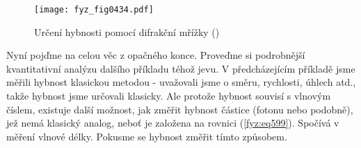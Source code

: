     \begin{figure}[ht!] %
      \centering
      \texttt{[image: fyz\_fig0434.pdf]}
      \caption{Určení hybnosti pomocí difrakční mřížky (\cite[s.~513]{Feynman01})}
      \label{fyz:fig0434}
    \end{figure}

    Nyní pojďme na celou věc z opačného konce. Proveďme si podrobnější kvantitativní analýzu dalšího
    příkladu téhož jevu. V předcházejícím příkladě jsme měřili hybnost klasickou metodou - uvažovali
    jsme o směru, rychlosti, úhlech atd., takže hybnost jsme určovali klasicky. Ale protože hybnost
    souvisí s vlnovým číslem, existuje další možnost, jak změřit hybnost částice (fotonu nebo
    podobně), jež nemá klasický analog, neboť je založena na rovnici (\ref{fyz:eq599}). Spočívá v
    měření vlnové délky. Pokusme se hybnost změřit tímto způsobem.
    
